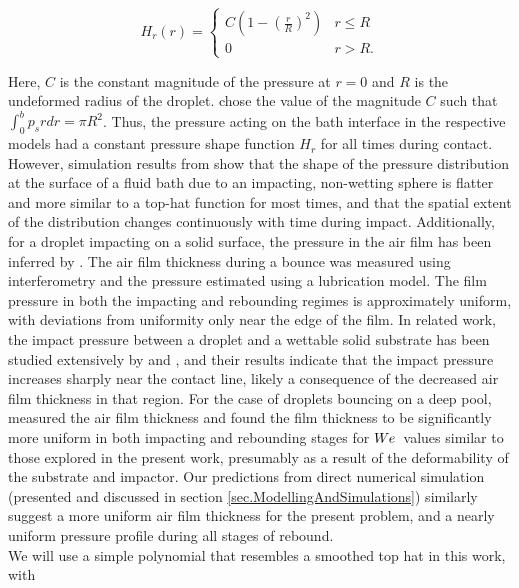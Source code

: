 \documentclass{jfm}
\begin{document}
\begin{equation}
H_r(r) =  \begin{cases} 
      C \left( 1 - (\frac{r}{R})^2 \right) & r\leq R \\
      0 & r > R \text{.}
   \end{cases}
\end{equation}

Here, $C$ is the constant magnitude of the pressure at $r=0$ and $R$ is the undeformed radius of the droplet.  \cite{blanchette2016modeling,blanchette2017octahedra} chose the value of the magnitude $C$ such that $\int_0^b p_s r dr= \pi R^2$. Thus, the pressure acting on the bath interface in the respective models had a constant pressure shape function $H_r$ for all times during contact. However, simulation results from \cite{galeano2017non,galeano2021capillary} show that the shape of the pressure distribution at the surface of a fluid bath due to an impacting, non-wetting sphere is flatter and more similar to a top-hat function for most times, and that the spatial extent of the distribution changes continuously with time during impact. Additionally, for a droplet impacting on a solid surface, the pressure in the air film has been inferred by \cite{de2015wettability}. The air film thickness during a bounce was measured using interferometry and the pressure estimated using a lubrication model. The film pressure in both the impacting and rebounding regimes is approximately uniform, with deviations from uniformity only near the edge of the film. In related work, the impact pressure between a droplet and a wettable solid substrate has been studied extensively by \cite{mandre2009precursors} and \cite{mani2010events}, and their results indicate that the impact pressure increases sharply near the contact line, likely a consequence of the decreased air film thickness in that region.  For the case of droplets bouncing on a deep pool, \cite{tang2019bouncing} measured the air film thickness and found the film thickness to be significantly more uniform in both impacting and rebounding stages for $W\kern-0.03em e\,$ values similar to those explored in the present work, presumably as a result of the deformability of the substrate and impactor.  Our predictions from direct numerical simulation (presented and discussed in section \ref{sec.ModellingAndSimulations}) similarly suggest a more uniform air film thickness for the present problem, and a nearly uniform pressure profile during all stages of rebound. \\
\hspace*{1em} We will use a simple polynomial that resembles a smoothed top hat in this work, with 
\end{document}
